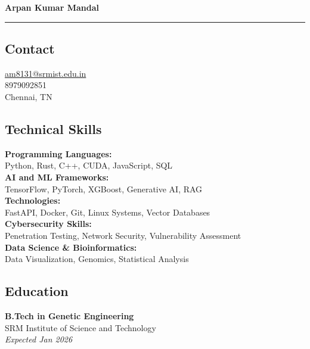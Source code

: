 \documentclass[10pt,a4paper]{article}
\begin{document}
\begin{center}
    {\Huge\bfseries\sffamily Arpan Kumar Mandal}
    \vspace{4pt}
    \noindent\rule{\linewidth}{0.8pt}
\end{center}
\vspace{16pt}


\begin{minipage}[t]{0.3\textwidth}
    \sffamily %
    
    \subsection*{Contact}
    \href{mailto:am8131@srmist.edu.in}{am8131@srmist.edu.in} \\
    8979092851 \\
    Chennai, TN
    \vspace{10pt}

    \subsection*{Technical Skills}
    \textbf{Programming Languages:} \\
    Python, Rust, C++, CUDA, JavaScript, SQL \\[5pt]
    \textbf{AI and ML Frameworks:} \\
    TensorFlow, PyTorch, XGBoost, Generative AI, RAG \\[5pt]
    \textbf{Technologies:} \\
    FastAPI, Docker, Git, Linux Systems, Vector Databases \\[5pt]
    \textbf{Cybersecurity Skills:} \\
    Penetration Testing, Network Security, Vulnerability Assessment \\[5pt]
    \textbf{Data Science & Bioinformatics:} \\
    Data Visualization, Genomics, Statistical Analysis
    \vspace{10pt}

    \subsection*{Education}
    \textbf{B.Tech in Genetic Engineering} \\
    SRM Institute of Science and Technology \\
    \textit{Expected Jan 2026} \\[8pt]
    

\end{minipage}
\end{document}

